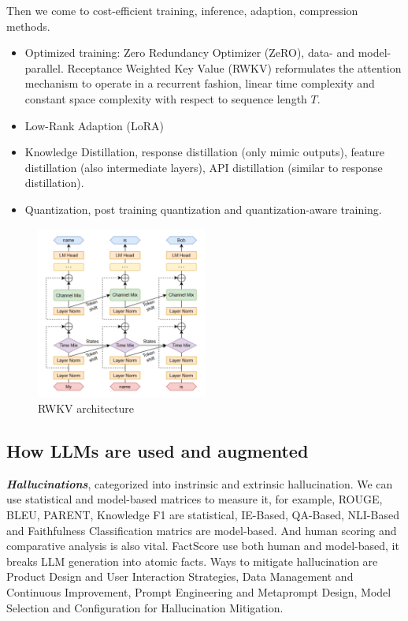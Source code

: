 \documentclass[10pt]{elegantbook}
\newcommand{\mydefination}[1]{\textbf{\textit{\textcolor{structurecolor}{#1}}}}
\begin{document}
\vspace{\baselineskip}

Then we come to cost-efficient training, inference, adaption, compression methods.
\begin{itemize}
    \item Optimized training: Zero Redundancy Optimizer (ZeRO), data- and model-parallel. Receptance Weighted Key Value (RWKV) reformulates the attention 
mechanism to operate in a recurrent fashion, linear time complexity and constant space complexity with respect to sequence length $T$.
    \item Low-Rank Adaption (LoRA)
    \item Knowledge Distillation, response distillation (only mimic outputs), feature distillation (also intermediate layers), API distillation (similar to
response distillation).
    \item Quantization, post training quantization and quantization-aware training.
\end{itemize}

\begin{figure}[htbp]
    \centering
    \includegraphics[width=0.50\textwidth]{image/rwkv.png}
    \caption{RWKV architecture}
    \label{fig:rwkv}
\end{figure}

\subsection{How LLMs are used and augmented}

\mydefination{Hallucinations}, categorized into instrinsic and extrinsic hallucination. We can use statistical and model-based matrices to measure it, for 
example, ROUGE, BLEU, PARENT, Knowledge F1 are statistical, IE-Based, QA-Based, NLI-Based and Faithfulness Classification matrics are model-based. And human 
scoring and comparative analysis is also vital. FactScore use both human and model-based, it breaks LLM generation into atomic facts. Ways to mitigate hallucination
are Product Design and User Interaction Strategies, Data Management and Continuous Improvement, Prompt Engineering and Metaprompt Design, Model Selection and Configuration for Hallucination
Mitigation.
\end{document}
